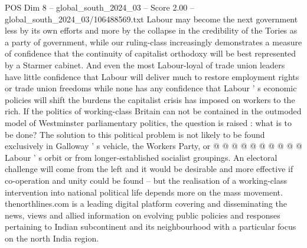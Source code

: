 \begin{textsample}{POS Dim 8 – global\_south\_2024\_03 – Score 2.00 – global\_south\_2024\_03/106488569.txt}
Labour may become the next government less by its own efforts and more by the collapse in the credibility of the Tories as a party of government, while our ruling-class increasingly demonstrates a measure of confidence that the continuity of capitalist orthodoxy will be best represented by a Starmer cabinet.
And even the most Labour-loyal of trade union leaders have little confidence that Labour will deliver much to restore employment rights or trade union freedoms while none has any confidence that Labour ' s economic policies will shift the burdens the capitalist crisis has imposed on workers to the rich.
If the politics of working-class Britain can not be contained in the outmoded model of Westminster parliamentary politics, the question is raised : what is to be done?
The solution to this political problem is not likely to be found exclusively in Galloway ' s vehicle, the Workers Party, or @ @ @ @ @ @ @ @ @ @ Labour ' s orbit or from longer-established socialist groupings.
An electoral challenge will come from the left and it would be desirable and more effective if co-operation and unity could be found -- but the realisation of a working-class intervention into national political life depends more on the mass movement. thenorthlines.com is a leading digital platform covering and disseminating the news, views and allied information on evolving public policies and responses pertaining to Indian subcontinent and its neighbourhood with a particular focus on the north India region.

\end{textsample}
